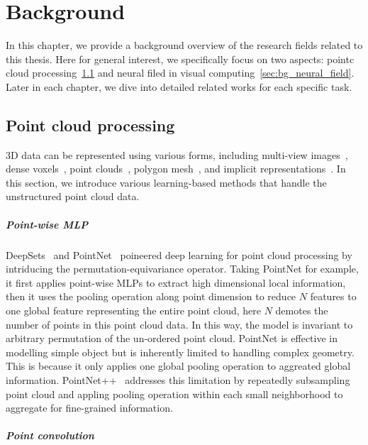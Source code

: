 \chapter{Background}
\label{chap:background}
In this chapter, we provide a background overview of the research ﬁelds related to this thesis. Here for general interest, we specifically focus on two aspects: pointc cloud processing~\cref{sec:bg_point_cloud} and neural filed in visual computing~\cref{sec:bg_neural_field}. Later in each chapter, we dive into detailed related works for each specific task.


\section{Point cloud processing}
\label{sec:bg_point_cloud}
3D data can be represented using various forms, including multi-view images~\cite{su2015multi}, dense voxels~\cite{choy20163d}, point clouds~\cite{qi2017pointnet,qi2017pointnet++}, polygon mesh~\cite{hanocka2019meshcnn}, and implicit representations~\cite{niemeyer2019occupancy,park2019deepsdf,chen2019learning}. In this section, we introduce various learning-based methods that handle the unstructured point cloud data. 

\paragraph{Point-wise MLP}
DeepSets~\cite{zaheer2017deep} and PointNet~\cite{qi2017pointnet} poineered deep learning for point cloud processing by intriducing the permutation-equivariance operator. Taking PointNet for example, it first applies point-wise MLPs to extract high dimensional local information, then it uses the pooling operation along point dimension to reduce $N$ features to one global feature representing the entire point cloud, here $N$ demotes the number of points in this point cloud data. In this way, the model is invariant to arbitrary permutation of the un-ordered point cloud. PointNet is effective in modelling simple object but is inherently limited to handling complex geometry. This is because it only applies one global pooling operation to aggreated global information. PointNet++~\cite{qi2017pointnet++} addresses this limitation by repeatedly subsampling point cloud and appling pooling operation within each small neighborhood to aggregate for fine-grained information. 

\paragraph{Point convolution}




